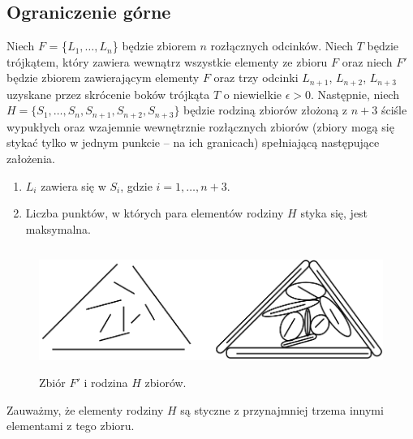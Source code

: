 \documentclass[brudnopis]{xmgr}
\theoremstyle{definition}
\begin{document}
\subsection{Ograniczenie górne}
\indent Niech $F$ = \{$L_1, \ldots, L_n$\} będzie zbiorem $n$ rozłącznych odcinków. Niech $T$ będzie trójkątem, który zawiera wewnątrz wszystkie elementy ze zbioru $F$ oraz niech $F'$ będzie zbiorem zawierającym elementy $F$ oraz trzy odcinki $L_{n+1}$, $L_{n+2}$, $L_{n+3}$ uzyskane przez skrócenie boków trójkąta $T$ o niewielkie $\epsilon > 0$.
Następnie, niech $H = \{S_1,\ldots,S_n,S_{n+1},S_{n+2},S_{n+3}\}$ będzie rodziną zbiorów złożoną z $n + 3$ ściśle wypukłych oraz wzajemnie wewnętrznie rozłącznych zbiorów (zbiory mogą się stykać tylko w jednym punkcie -- na ich granicach) spełniającą następujące założenia.
\begin{enumerate}
  \item $L_i$ zawiera się w $S_i$, gdzie $i = 1,\ldots,n+3$.
  \item Liczba punktów, w których para elementów rodziny $H$ styka się, jest maksymalna.
\end{enumerate}
\begin{figure}[ht!]
 \centering
  \includegraphics[height=4cm, width=13.5cm]{rysunki/podswietlenie.png}
  \caption{Zbiór $F'$ i rodzina $H$ zbiorów.}
\end{figure} 
Zauważmy, że elementy rodziny $H$ są styczne z przynajmniej trzema innymi elementami z tego zbioru. 
\end{document}

